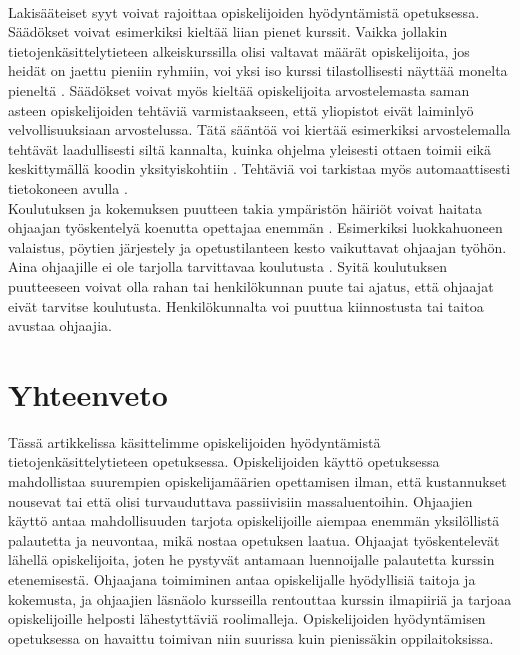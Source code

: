 \documentclass[finnish]{tktltiki2}
\theoremstyle{definition}
\theoremstyle{remark}
\begin{document}
\\
Lakisääteiset syyt voivat rajoittaa opiskelijoiden hyödyntämistä opetuksessa. Säädökset voivat esimerkiksi kieltää liian pienet kurssit. Vaikka jollakin tietojenkäsittelytieteen alkeiskurssilla olisi valtavat määrät opiskelijoita, jos heidät on jaettu pieniin ryhmiin, voi yksi iso kurssi tilastollisesti näyttää monelta pieneltä \cite{Reges03}. Säädökset voivat myös kieltää opiskelijoita arvostelemasta saman asteen opiskelijoiden tehtäviä varmistaakseen, että yliopistot eivät laiminlyö velvollisuuksiaan arvostelussa. Tätä sääntöä voi kiertää esimerkiksi arvostelemalla tehtävät laadullisesti siltä kannalta, kuinka ohjelma yleisesti ottaen toimii eikä keskittymällä koodin yksityiskohtiin \cite{Dickson11}. Tehtäviä voi tarkistaa myös automaattisesti tietokoneen avulla \cite{Vihavainen}.
\\
Koulutuksen ja kokemuksen puutteen takia ympäristön häiriöt voivat haitata ohjaajan työskentelyä koenutta opettajaa enemmän \cite{Patitsas12_3}. Esimerkiksi luokkahuoneen valaistus, pöytien järjestely ja opetustilanteen kesto vaikuttavat ohjaajan työhön.
\\
Aina ohjaajille ei ole tarjolla tarvittavaa koulutusta \cite{Shannon98}. Syitä koulutuksen puutteeseen voivat olla rahan tai henkilökunnan puute tai ajatus, että ohjaajat eivät tarvitse koulutusta. Henkilökunnalta voi puuttua kiinnostusta tai taitoa avustaa ohjaajia.



\section{Yhteenveto}
Tässä artikkelissa käsittelimme opiskelijoiden hyödyntämistä tie\-to\-jen\-kä\-sit\-te\-ly\-tie\-teen opetuksessa. Opiskelijoiden käyttö opetuksessa mahdollistaa suurempien opiskelijamäärien opettamisen ilman, että kustannukset nousevat tai että olisi turvauduttava passiivisiin massaluentoihin. Ohjaajien käyttö antaa mahdollisuuden tarjota opiskelijoille aiempaa enemmän yksilöllistä palautetta ja neuvontaa, mikä nostaa opetuksen laatua. Ohjaajat työskentelevät lähellä opiskelijoita, joten he pystyvät antamaan luennoijalle palautetta kurssin etenemisestä. Ohjaajana toimiminen antaa opiskelijalle hyödyllisiä taitoja ja kokemusta, ja ohjaajien läsnäolo kursseilla rentouttaa kurssin ilmapiiriä ja tarjoaa opiskelijoille helposti lähestyttäviä roolimalleja. Opiskelijoiden hyödyntämisen opetuksessa on havaittu toimivan niin suurissa kuin pienissäkin oppilaitoksissa.




\end{document}
